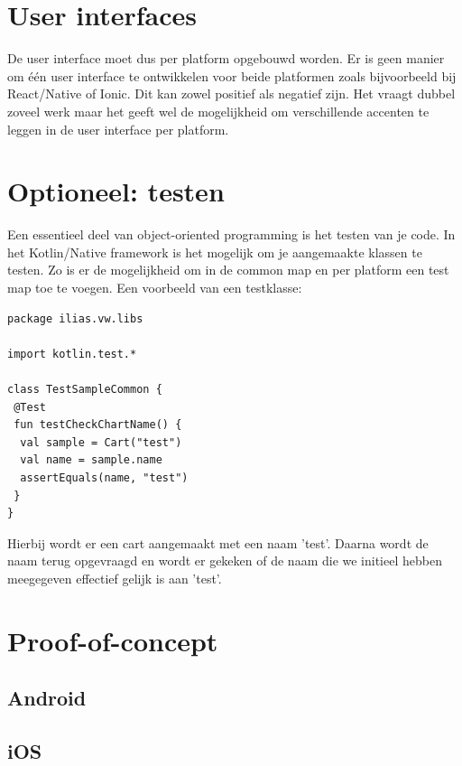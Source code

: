\section{User interfaces}
De user interface moet dus per platform opgebouwd worden. Er is geen manier om één user interface te ontwikkelen voor beide platformen zoals bijvoorbeeld bij React/Native of Ionic. Dit kan zowel positief als negatief zijn. Het vraagt dubbel zoveel werk maar het geeft wel de mogelijkheid om verschillende accenten te leggen in de user interface per platform.

\section{Optioneel: testen}
\label{sec:testing}
Een essentieel deel van object-oriented programming is het testen van je code. In het Kotlin/Native framework is het mogelijk om je aangemaakte klassen te testen. Zo is er de mogelijkheid om in de common map en per platform een test map toe te voegen. Een voorbeeld van een testklasse:

\begin{lstlisting}
package ilias.vw.libs

import kotlin.test.*

class TestSampleCommon {
 @Test
 fun testCheckChartName() {
  val sample = Cart("test")
  val name = sample.name
  assertEquals(name, "test")
 }
}

\end{lstlisting}

Hierbij wordt er een cart aangemaakt met een naam 'test'. Daarna wordt de naam terug opgevraagd en wordt er gekeken of de naam die we initieel hebben meegegeven effectief gelijk is aan 'test'.

\section{Proof-of-concept}
\subsection{Android}
\subsection{iOS}